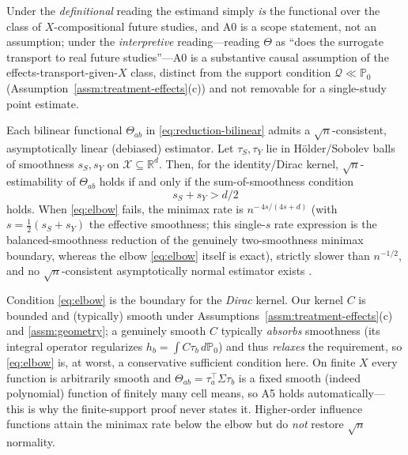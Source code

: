 \begin{remark}
\label{rem:A0-reading}
Under the \emph{definitional} reading the estimand simply \emph{is} the functional over the
class of $X$-compositional future studies, and A0 is a scope statement, not an assumption;
under the \emph{interpretive} reading---reading $\Theta$ as ``does the surrogate transport to
real future studies''---A0 is a substantive causal assumption of the effects-transport-given-$X$
class, distinct from the support condition $\mathcal{Q}\ll\mathbb{P}_0$
(Assumption~\ref{assm:treatment-effects}(c)) and not removable for a single-study point estimate.
\end{remark}

\begin{assumption}
\label{assm:A5-elbow}
Each bilinear functional $\Theta_{ab}$ in \eqref{eq:reduction-bilinear} admits a
$\sqrt{n}$-consistent, asymptotically linear (debiased) estimator. Let $\tau_S,\tau_Y$ lie in
H\"older/Sobolev balls of smoothness $s_S,s_Y$ on $\mathcal{X}\subseteq\mathbb{R}^d$. Then, for
the identity/Dirac kernel, $\sqrt{n}$-estimability of $\Theta_{ab}$ holds if and only if the
sum-of-smoothness condition
\begin{equation}
s_S + s_Y > d/2
\label{eq:elbow}
\end{equation}
holds. When \eqref{eq:elbow} fails, the minimax rate is
$n^{-\,4s/(4s+d)}$ (with $s=\tfrac{1}{2}(s_S+s_Y)$ the effective smoothness; this single-$s$
rate expression is the balanced-smoothness reduction of the genuinely two-smoothness minimax
boundary, whereas the elbow \eqref{eq:elbow} itself is exact), strictly slower
than $n^{-1/2}$, and no $\sqrt{n}$-consistent asymptotically normal estimator exists
\cite{BickelRitov1988,BirgeMassart1995,Robins2008HOIF,Robins2017Minimax,Kennedy2024Minimax,McClean2024DCDR}.
\end{assumption}

\begin{remark}
\label{rem:A5-conservative}
Condition \eqref{eq:elbow} is the boundary for the \emph{Dirac} kernel. Our kernel $C$ is
bounded and (typically) smooth under Assumptions~\ref{assm:treatment-effects}(c) and
\ref{assm:geometry}; a genuinely smooth $C$ typically \emph{absorbs} smoothness (its integral
operator regularizes $h_b=\int C\tau_b\,d\mathbb{P}_0$) and thus \emph{relaxes} the requirement,
so \eqref{eq:elbow} is, at worst, a conservative sufficient condition here. On finite
$X$ every function is arbitrarily smooth and $\Theta_{ab}=\tau_a^\top\Sigma\tau_b$ is a fixed
smooth (indeed polynomial) function of finitely many cell means, so A5 holds automatically---%
this is why the finite-support proof never states it. Higher-order influence functions attain
the minimax rate below the elbow but do \emph{not} restore $\sqrt{n}$ normality.
\end{remark}

